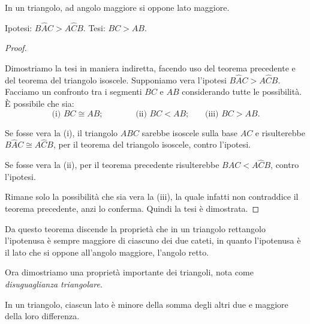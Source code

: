 \newpage %

\begin{teorema}
  In un triangolo, ad angolo maggiore si oppone lato maggiore.
\end{teorema}

  \noindent Ipotesi: $B\widehat{A}C>A\widehat{C}B$. Tesi: $BC>AB$.

\noindent\begin{proof}
~

\noindent\begin{minipage}{0.7\textwidth}\parindent15pt
    \noindent Dimostriamo la tesi in maniera indiretta, facendo uso del 
    teorema precedente e del teorema del triangolo isoscele. Supponiamo 
    vera l'ipotesi $B\widehat{A}C>A\widehat{C}B$. Facciamo un confronto 
    tra i segmenti $BC$ e $AB$ considerando tutte le possibilità. \`E 
    possibile che sia:
    \[\text{(i) }BC\cong AB\text{;}\qquad\qquad \text{(ii) 
    }BC<AB\text{;}\quad\quad\text{(iii) }BC>AB\text{.}\]
\end{minipage}\hfil
\begin{minipage}{0.3\textwidth}
  \centering
\end{minipage}
    Se fosse vera la (i), il triangolo $ABC$ sarebbe isoscele sulla base 
    $AC$ e risulterebbe $B\widehat{A}C\cong A\widehat{C}B$, per il 
    teorema del triangolo isoscele, contro l'ipotesi.
    
    Se fosse vera la (ii), per il teorema precedente risulterebbe 
    $B\widehat{A}C<A\widehat{C}B$, contro l'ipotesi.
    
    Rimane solo la possibilità che sia vera la (iii), la quale infatti 
    non contraddice il teorema precedente, anzi lo conferma. Quindi la 
    tesi è dimostrata.
\end{proof}


Da questo teorema discende la proprietà che in un triangolo 
rettangolo l'ipotenusa è sempre maggiore di ciascuno dei due cateti, 
in quanto l'ipotenusa è il lato che si oppone all'angolo maggiore, 
l'angolo retto.

Ora dimostriamo una proprietà importante dei triangoli, nota come 
\emph{disuguaglianza triangolare}.

\begin{teorema}
  In un triangolo, ciascun lato è minore della somma degli altri due e 
  maggiore della loro differenza.
\end{teorema}

